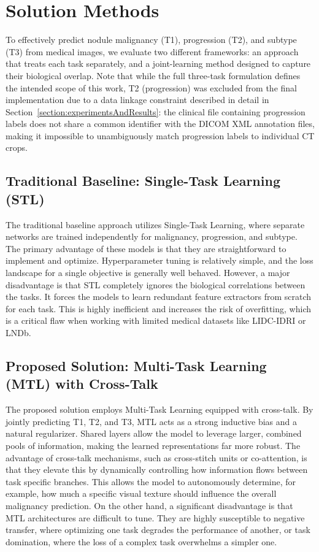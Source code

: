 \section{Solution Methods}
\label{section:solutionMethods}

To effectively predict nodule malignancy (T1), progression (T2), and subtype (T3) from medical images, we evaluate two different frameworks: an approach that treats each task separately, and a joint-learning method designed to capture their biological overlap. Note that while the full three-task formulation defines the intended scope of this work, T2 (progression) was excluded from the final implementation due to a data linkage constraint described in detail in Section~\ref{section:experimentsAndResults}: the clinical file containing progression labels does not share a common identifier with the DICOM XML annotation files, making it impossible to unambiguously match progression labels to individual CT crops.

\subsection{Traditional Baseline: Single-Task Learning (STL)}
The traditional baseline approach utilizes Single-Task Learning, where separate networks are trained independently for malignancy, progression, and subtype. The primary advantage of these models is that they are straightforward to implement and optimize. Hyperparameter tuning is relatively simple, and the loss landscape for a single objective is generally well behaved. However, a major disadvantage is that STL completely ignores the biological correlations between the tasks. It forces the models to learn redundant feature extractors from scratch for each task. This is highly inefficient and increases the risk of overfitting, which is a critical flaw when working with limited medical datasets like LIDC-IDRI or LNDb.

\subsection{Proposed Solution: Multi-Task Learning (MTL) with Cross-Talk}
The proposed solution employs Multi-Task Learning equipped with cross-talk. By jointly predicting T1, T2, and T3, MTL acts as a strong inductive bias and a natural regularizer. Shared layers allow the model to leverage larger, combined pools of information, making the learned representations far more robust. The advantage of cross-talk mechanisms, such as cross-stitch units or co-attention, is that they elevate this by dynamically controlling how information flows between task specific branches. This allows the model to autonomously determine, for example, how much a specific visual texture should influence the overall malignancy prediction. On the other hand, a significant disadvantage is that MTL architectures are difficult to tune. They are highly susceptible to negative transfer, where optimizing one task degrades the performance of another, or task domination, where the loss of a complex task overwhelms a simpler one.

